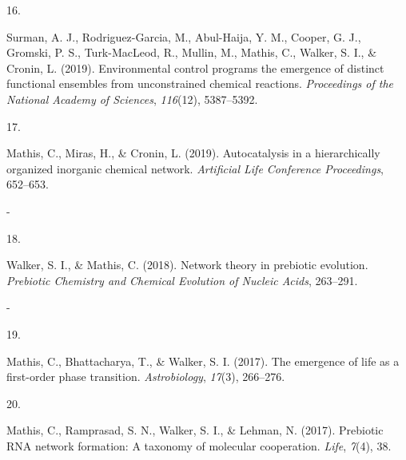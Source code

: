 \documentclass[11pt,a4paper,]{awesome-cv}
\newlength{\cslhangindent}
\newlength{\csllabelwidth}
\newenvironment{CSLReferences}[2] %
 {\begin{list}{}{%
  \setlength{\itemindent}{0pt}
  \setlength{\leftmargin}{0pt}
  \setlength{\parsep}{0pt}
  \ifodd #1
   \setlength{\leftmargin}{\cslhangindent}
   \setlength{\itemindent}{-1\cslhangindent}
  \fi
  \setlength{\itemsep}{#2\baselineskip}}}
 {\end{list}}
\newcommand{\CSLBlock}[1]{\hfill\break\parbox[t]{\linewidth}{\strut\ignorespaces#1\strut}}
\newcommand{\CSLLeftMargin}[1]{\parbox[t]{\csllabelwidth}{\strut#1\strut}}
\newcommand{\CSLRightInline}[1]{\parbox[t]{\linewidth - \csllabelwidth}{\strut#1\strut}}
\begin{document}
\begin{CSLReferences}{0}{0}
\CSLLeftMargin{16. }%
\CSLRightInline{Surman, A. J., Rodriguez-Garcia, M., Abul-Haija, Y. M.,
Cooper, G. J., Gromski, P. S., Turk-MacLeod, R., Mullin, M., Mathis, C.,
Walker, S. I., \& Cronin, L. (2019). Environmental control programs the
emergence of distinct functional ensembles from unconstrained chemical
reactions. \emph{Proceedings of the National Academy of Sciences},
\emph{116}(12), 5387--5392.}

\CSLLeftMargin{17. }%
\CSLRightInline{Mathis, C., Miras, H., \& Cronin, L. (2019).
Autocatalysis in a hierarchically organized inorganic chemical network.
\emph{Artificial Life Conference Proceedings}, 652--653.
\CSLBlock{-}}

\CSLLeftMargin{18. }%
\CSLRightInline{Walker, S. I., \& Mathis, C. (2018). Network theory in
prebiotic evolution. \emph{Prebiotic Chemistry and Chemical Evolution of
Nucleic Acids}, 263--291.
\CSLBlock{-}}

\CSLLeftMargin{19. }%
\CSLRightInline{Mathis, C., Bhattacharya, T., \& Walker, S. I. (2017).
The emergence of life as a first-order phase transition.
\emph{Astrobiology}, \emph{17}(3), 266--276.}

\CSLLeftMargin{20. }%
\CSLRightInline{Mathis, C., Ramprasad, S. N., Walker, S. I., \& Lehman,
N. (2017). Prebiotic RNA network formation: A taxonomy of molecular
cooperation. \emph{Life}, \emph{7}(4), 38.}

\end{CSLReferences}


\label{LastPage}~
\end{document}
